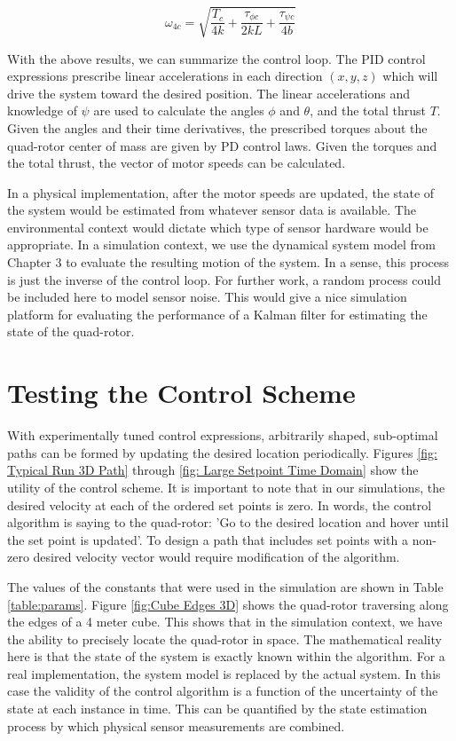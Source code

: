 \begin{equation}
    \omega_{4c} = \sqrt{ \frac{T_c}{4 k} + \frac{ \tau_{\phi c}}{2 k L}   + \frac{ \tau_{\psi c} }{4 b } }
\end{equation}


With the above results, we can summarize the control loop. The PID control expressions prescribe linear accelerations in each direction $(x,y,z)$ which will drive the system toward the desired position. The linear accelerations and knowledge of $\psi$ are used to calculate the angles $\phi$ and $\theta$, and the total thrust $T$. Given the angles and their time derivatives, the prescribed torques about the quad-rotor center of mass are given by PD control laws. Given the torques and the total thrust, the vector of motor speeds can be calculated.


In a physical implementation, after the motor speeds are updated, the state of the system would be estimated from whatever sensor data is available. The environmental context would dictate which type of sensor hardware would be appropriate. In a simulation context, we use the dynamical system model from Chapter 3 to evaluate the resulting motion of the system. In a sense, this process is just the inverse of the control loop. For further work, a random process could be included here to model sensor noise. This would give a nice simulation platform for evaluating the performance of a Kalman filter for estimating the state of the quad-rotor.

\section{Testing the Control Scheme}

With experimentally tuned control expressions, arbitrarily shaped, sub-optimal paths can be formed by updating the desired location periodically. Figures \ref{fig: Typical Run 3D Path} through \ref{fig: Large Setpoint Time Domain} show the utility of the control scheme. It is important to note that in our simulations, the desired velocity at each of the ordered set points is zero. In words, the control algorithm is saying to the quad-rotor: 'Go to the desired location and hover until the set point is updated'. To design a path that includes set points with a non-zero desired velocity vector would require modification of the algorithm.

The values of the constants that were used in the simulation are shown in Table \ref{table:params}. Figure \ref{fig:Cube Edges 3D} shows the quad-rotor traversing along the edges of a 4 meter cube. This shows that in the simulation context, we have the ability to precisely locate the quad-rotor in space. The mathematical reality here is that the state of the system is exactly known within the algorithm. For a real implementation, the system model is replaced by the actual system. In this case the validity of the control algorithm is a function of the uncertainty of the state at each instance in time. This can be quantified by the state estimation process by which physical sensor measurements are combined.

